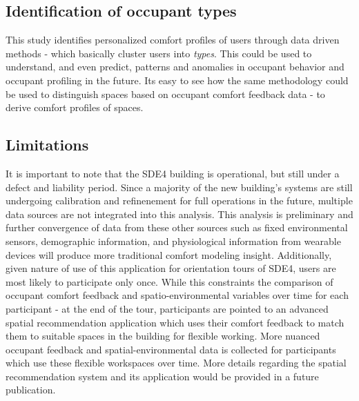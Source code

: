 \subsection{Identification of occupant types}

This study identifies personalized comfort profiles of users through data driven methods - which basically cluster users into \emph{types}. This could be used to understand, and even predict, patterns and anomalies in occupant behavior and occupant profiling in the future. Its easy to see how the same methodology could be used to distinguish spaces based on occupant comfort feedback data - to derive comfort profiles of spaces.


\subsection{Limitations}
It is important to note that the SDE4 building is operational, but still under a defect and liability period. Since a majority of the new building's systems are still undergoing calibration and refinenement for full operations in the future, multiple data sources are not integrated into this analysis. This analysis is preliminary and further convergence of data from these other sources such as fixed environmental sensors, demographic information, and physiological information from wearable devices will produce more traditional comfort modeling insight. Additionally, given nature of use of this application for orientation tours of SDE4, users are most likely to participate only once. While this constraints the comparison of occupant comfort feedback and spatio-environmental variables over time for each participant - at the end of the tour, participants are pointed to an advanced spatial recommendation application which uses their comfort feedback to match them to suitable spaces in the building for flexible working. More nuanced occupant feedback and spatial-environmental data is collected for participants which use these flexible workspaces over time. More details regarding the spatial recommendation system and its application would be provided in a future publication.









